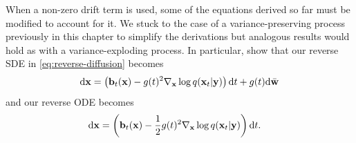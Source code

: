 When a non-zero drift term is used, some of the equations derived so far must be modified to account for it. We stuck to the case of a variance-preserving process previously in this chapter to simplify the derivations but analogous results would hold as with a variance-exploding process. In particular, \citet{song2020score} show that our reverse SDE in \cref{eq:reverse-diffusion} becomes
\begin{equation} \label{eq:reverse-diffusion-with-drift}
    \mathrm{d}{\mathbf{x}} = \left( {\mathbf{b}}_t({\mathbf{x}}) - g(t)^2 \nabla_{\mathbf{x}} \log q({\mathbf{x}}_t|{\mathbf{y}}) \right) \mathrm{d}t + g(t) \mathrm{d}\bar{{\mathbf{w}}}
\end{equation}
and our reverse ODE becomes
\begin{align}
    \mathrm{d}{\mathbf{x}} &= \left( {\mathbf{b}}_t({\mathbf{x}}) - \frac{1}{2} g(t)^2 \nabla_{\mathbf{x}} \log q({\mathbf{x}}_t|{\mathbf{y}}) \right) \mathrm{d}t.
\end{align}

